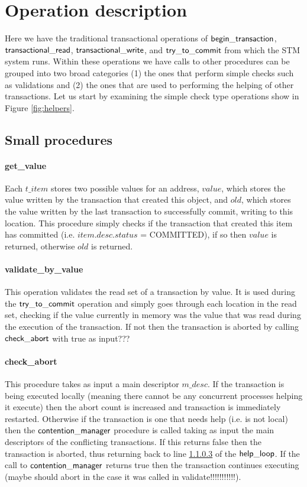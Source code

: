 \documentclass[runningheads,a4paper]{llncs}
\begin{document}
\section{Operation description}
Here we have the traditional transactional operations of ${\sf begin\_transaction}$, ${\sf transactional\_read}$, ${\sf transactional\_write}$,
and ${\sf try\_to\_commit}$ from which the STM system runs.
Within these operations we have calls to other procedures can be grouped into two broad categories (1) the ones that perform simple checks such
as validations and (2) the ones that are used to performing the helping of other transactions.
Let us start by examining the simple check type operations show in Figure \ref{fig:helpers}.

\subsection{Small procedures}

\paragraph{get\_value}
Each $t\_item$ stores two possible values for an address,
$\mathit{value}$, which stores the value written by the transaction that created this object,
and $\mathit{old}$, which stores the value written by the last transaction to successfully commit, writing to this location.
This procedure simply checks if the transaction that created this item has committed (i.e. $\mathit{item.desc.status}$ = COMMITTED), if
so then $\mathit{value}$ is returned, otherwise $\mathit{old}$ is returned.

\paragraph{validate\_by\_value}
This operation validates the read set of a transaction by value.
It is used during the ${\sf try\_to\_commit}$ operation and simply goes through each location
in the read set, checking if the value currently in memory was the value that was read during the execution of the transaction.
If not then the transaction is aborted by calling ${\sf check\_abort}$ with true as input???

\paragraph{check\_abort}
This procedure takes as input a main descriptor $\mathit{m\_desc}$.
If the transaction is being executed locally (meaning there cannot be any concurrent processes helping it execute)
then the abort count is increased and transaction is immediately restarted.
Otherwise if the transaction is one that needs help (i.e. is not local) then the ${\sf contention\_manager}$ procedure is called
taking as input the main descriptors of the conflicting transactions.
If this returns false then the transaction is aborted, thus returning back to line \ref{} of the ${\sf help\_loop}$.
If the call to ${\sf contention\_manager}$ returns true then the transaction continues executing (maybe should abort in the case it was called
in validate!!!!!!!!!!!).
\end{document}
